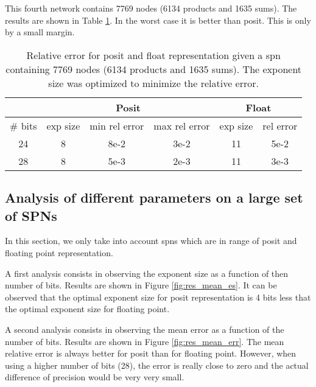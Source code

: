 This fourth network contains 7769 nodes (6134 products and 1635 sums). The results are shown in Table \ref{tab:net4_res}. In the worst case it is better than posit. This is only by a small margin.

\begin{table}[!ht]
	\centering
	\caption{Relative error for posit and float representation given a \gls{spn} containing 7769 nodes (6134 products and 1635 sums). The exponent size was optimized to minimize the relative error.}
	\label{tab:net4_res}
	\begin{tabular}{|c||c|c|c||c|c|}
	\hline
		& \multicolumn{3}{c||}{Posit} &  \multicolumn{2}{c|}{Float} \\
	\hline
		\# bits & exp size & min rel error & max rel error & exp size & rel error \\
	\hline
		24 & 8 & 8e-2 & 3e-2 & 11 & 5e-2 \\
		28 & 8 & 5e-3 & 2e-3 & 11 & 3e-3 \\
	\hline
	\end{tabular}
\end{table}



\subsection{Analysis of different parameters on a large set of SPNs}

In this section, we only take into account \glspl{spn} which are in range of posit and floating point representation.

A first analysis consists in observing the exponent size as a function of then number of bits. Results are shown in Figure \ref{fig:res_mean_es}. It can be observed that the optimal exponent size for posit representation is 4 bits less that the optimal exponent size for floating point.

A second analysis consists in observing the mean error as a function of the number of bits. Results are shown in Figure \ref{fig:res_mean_err}. The mean relative error is always better for posit than for floating point. However, when using a higher number of bits (28), the error is really close to zero and the actual difference of precision would be very very small.





